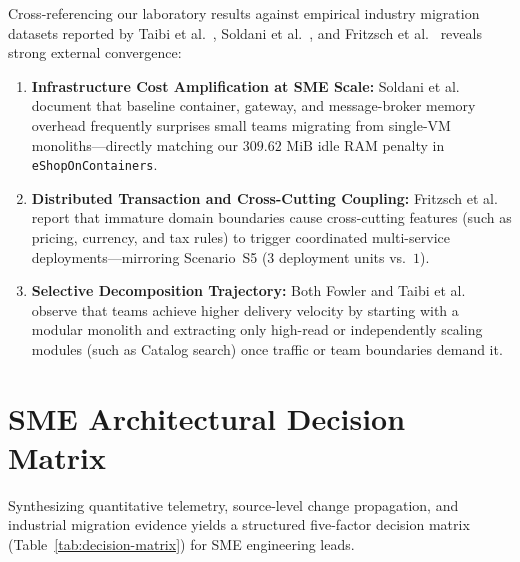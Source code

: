 Cross-referencing our laboratory results against empirical industry migration datasets reported by Taibi et al.\ \cite{taibi2017}, Soldani et al.\ \cite{soldani2018}, and Fritzsch et al.\ \cite{fritzsch2019} reveals strong external convergence:
\begin{enumerate}[leftmargin=1.5em]
  \item \textbf{Infrastructure Cost Amplification at SME Scale:} Soldani et al.\ \cite{soldani2018} document that baseline container, gateway, and message-broker memory overhead frequently surprises small teams migrating from single-VM monoliths—directly matching our $309.62\text{ MiB}$ idle RAM penalty in \texttt{eShopOnContainers}.
  \item \textbf{Distributed Transaction and Cross-Cutting Coupling:} Fritzsch et al.\ \cite{fritzsch2019} report that immature domain boundaries cause cross-cutting features (such as pricing, currency, and tax rules) to trigger coordinated multi-service deployments—mirroring Scenario~S5 ($3$ deployment units vs.\ $1$).
  \item \textbf{Selective Decomposition Trajectory:} Both Fowler \cite{fowler2015monolith} and Taibi et al.\ \cite{taibi2017} observe that teams achieve higher delivery velocity by starting with a modular monolith and extracting only high-read or independently scaling modules (such as Catalog search) once traffic or team boundaries demand it.
\end{enumerate}

\section{SME Architectural Decision Matrix}
\label{sec:decision-matrix}

Synthesizing quantitative telemetry, source-level change propagation, and industrial migration evidence yields a structured five-factor decision matrix (Table~\ref{tab:decision-matrix}) for SME engineering leads.

